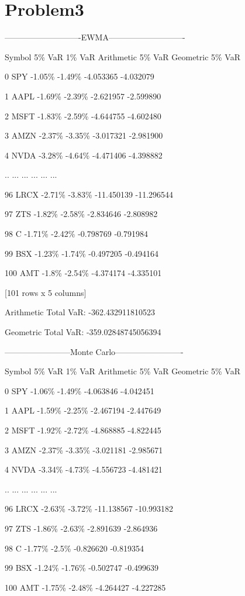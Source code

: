\documentclass{article}
\begin{document}
\section{Problem3}
----------------------------EWMA----------------------------\par
    Symbol  5\% VaR  1\% VaR  Arithmetic 5\% VaR  Geometric 5\% VaR\par
0      SPY  -1.05\%  -1.49\%          -4.053365         -4.032079\par
1     AAPL  -1.69\%  -2.39\%          -2.621957         -2.599890\par
2     MSFT  -1.83\%  -2.59\%          -4.644755         -4.602480\par
3     AMZN  -2.37\%  -3.35\%          -3.017321         -2.981900\par
4     NVDA  -3.28\%  -4.64\%          -4.471406         -4.398882\par
..     ...     ...     ...                ...               ...\par
96    LRCX  -2.71\%  -3.83\%         -11.450139        -11.296544\par
97     ZTS  -1.82\%  -2.58\%          -2.834646         -2.808982\par
98       C  -1.71\%  -2.42\%          -0.798769         -0.791984\par
99     BSX  -1.23\%  -1.74\%          -0.497205         -0.494164\par
100    AMT   -1.8\%  -2.54\%          -4.374174         -4.335101\par

[101 rows x 5 columns]\par
Arithmetic Total VaR: -362.432911810523\par
Geometric Total VaR: -359.02848745056394\par

------------------------Monte Carlo-------------------------\par
    Symbol  5\% VaR  1\% VaR  Arithmetic 5\% VaR  Geometric 5\% VaR\par
0      SPY  -1.06\%  -1.49\%          -4.063846         -4.042451\par
1     AAPL  -1.59\%  -2.25\%          -2.467194         -2.447649\par
2     MSFT  -1.92\%  -2.72\%          -4.868885         -4.822445\par
3     AMZN  -2.37\%  -3.35\%          -3.021181         -2.985671\par
4     NVDA  -3.34\%  -4.73\%          -4.556723         -4.481421\par
..     ...     ...     ...                ...               ...\par
96    LRCX  -2.63\%  -3.72\%         -11.138567        -10.993182\par
97     ZTS  -1.86\%  -2.63\%          -2.891639         -2.864936\par
98       C  -1.77\%   -2.5\%          -0.826620         -0.819354\par
99     BSX  -1.24\%  -1.76\%          -0.502747         -0.499639\par
100    AMT  -1.75\%  -2.48\%          -4.264427         -4.227285\par
\end{document}
